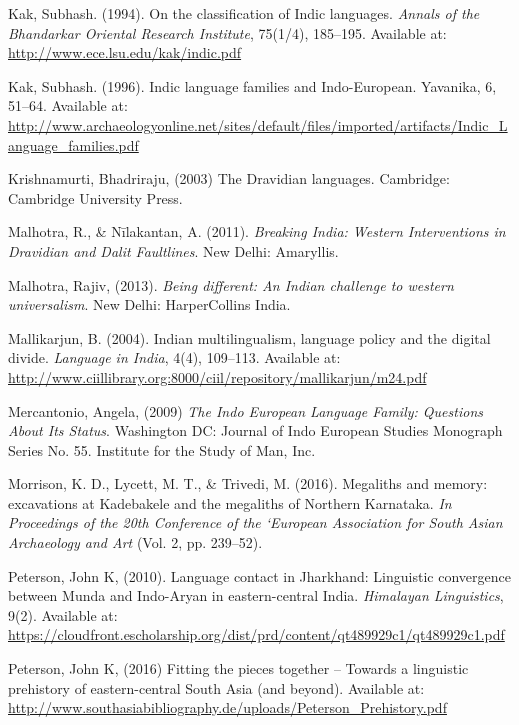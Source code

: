 \begin{thebibliography}{99}
  Kak, Subhash. (1994). On the classification of Indic languages. \textit{Annals of the Bhandarkar Oriental Research Institute}, 75(1/4), 185–195. Available at: \url{http://www.ece.lsu.edu/kak/indic.pdf}

  Kak, Subhash. (1996). Indic language families and Indo-European. Yavanika, 6, 51–64. Available at: \url{http://www.archaeologyonline.net/sites/default/files/imported/artifacts/Indic_Language_families.pdf}

  Krishnamurti, Bhadriraju, (2003) The Dravidian languages. Cambridge: Cambridge University Press.

  Malhotra, R., \& Nīlakantan, A. (2011). \textit{Breaking India: Western Interventions in Dravidian and Dalit Faultlines}. New Delhi: Amaryllis.

  Malhotra, Rajiv, (2013). \textit{Being different: An Indian challenge to western universalism}. New Delhi: HarperCollins India.

  Mallikarjun, B. (2004). Indian multilingualism, language policy and the digital divide. \textit{Language in India}, 4(4), 109–113. Available at: \url{http://www.ciillibrary.org:8000/ciil/repository/mallikarjun/m24.pdf}

  Mercantonio, Angela, (2009) \textit{The Indo European Language Family: Questions About Its Status}. Washington DC: Journal of Indo European Studies Monograph Series No. 55. Institute for the Study of Man, Inc.

  Morrison, K. D., Lycett, M. T., \& Trivedi, M. (2016). Megaliths and memory: excavations at Kadebakele and the megaliths of Northern Karnataka. \textit{In Proceedings of the 20th Conference of the ‘European Association for South Asian Archaeology and Art} (Vol. 2, pp. 239–52).

  Peterson, John K, (2010). Language contact in Jharkhand: Linguistic convergence between Munda and Indo-Aryan in eastern-central India. \textit{Himalayan Linguistics}, 9(2). Available at: \url{https://cloudfront.escholarship.org/dist/prd/content/qt489929c1/qt489929c1.pdf}

  Peterson, John K, (2016) Fitting the pieces together – Towards a linguistic prehistory of eastern-central South Asia (and beyond). Available at: \url{http://www.southasiabibliography.de/uploads/Peterson_Prehistory.pdf}


\end{thebibliography}
